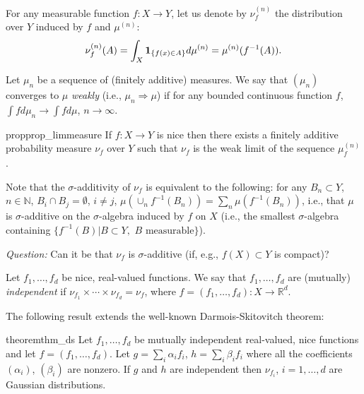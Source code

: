 \documentclass[12pt]{article}
\newcommand{\todoc}[2][]{\todo[color=Apricot,#1]{#2}}
\newcommand{\ra}{\rightarrow}
\newcommand{\real}{\mathbb{R}}
\newcommand{\one}[1]{\mathbf{1}_{\{#1\}}}
\renewcommand{\natural}{\mathbb{N}}
\begin{document}
For any measurable function $f:X \ra Y$, let us denote  
by $\nu^{(n)}_f$ the distribution over $Y$ induced by $f$ and $\mu^{(n)}$:
\[
\nu^{(n)}_f(A) = \int_X \one{f(x)\in A} \dmu^{(n)} = \mu^{(n)}( f^{-1}(A) ).
\]

Let $\mu_n$ be a sequence of (finitely additive) measures.
We say that $(\mu_n)$ converges to $\mu$ \emph{weakly} (i.e., $\mu_n \Rightarrow \mu$) if for any bounded continuous function $f$, $\int f d\mu_n \ra \int f d\mu$, $n\ra\infty$.

\begin{restatable}{prop}{prop_limmeasure}
If $f:X\ra Y$ is nice then there exists a finitely additive probability measure $\nu_f$ over $Y$ such that $\nu_f$ is the weak limit of the sequence $\mu^{(n)}_f$.
\end{restatable}

Note that the $\sigma$-additivity of $\nu_f$ is equivalent to the following: for any $B_n\subset Y$, $n\in \natural$, $B_i \cap B_j = \emptyset$, $i\ne j$, $\mu(\cup_n f^{-1}(B_n) ) = \sum_n \mu(f^{-1}(B_n))$, i.e., that $\mu$ is $\sigma$-additive on the $\sigma$-algebra induced by $f$ on $X$ (i.e., the smallest $\sigma$-algebra containing $\{f^{-1}(B)| B \subset Y, \,\, B \text{ measurable}\}$).

\emph{Question:} Can it be that $\nu_f$ is $\sigma$-additive (if, e.g., $f(X)\subset Y$ is compact)?


Let $f_1,\ldots, f_d$ be nice, real-valued functions.
We say that $f_1,\ldots, f_d$ are (mutually) \emph{independent}
 if $\nu_{f_1} \times \cdots \times \nu_{f_d} = \nu_f$, where $f = (f_1,\ldots, f_d):X\ra \real^d$.

The following result extends the well-known Darmois-Skitovitch theorem:
\begin{restatable}{theorem}{thm_ds}
Let $f_1,\ldots,f_d$ be mutually independent real-valued, nice functions and let $f = (f_1,\ldots,f_d)$.
Let $g = \sum_i \alpha_i f_i$, $h = \sum_i \beta_i f_i$ where all the coefficients $(\alpha_i)$, $(\beta_i)$ are nonzero.
If $g$ and $h$ are independent then $\nu_{f_i}$, $i=1,\ldots,d$ are Gaussian distributions.
\end{restatable}
\end{document}
